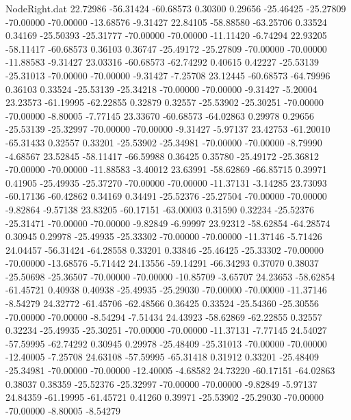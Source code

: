 \begin{filecontents}{NodeRight.dat}
  22.72986  -56.31424  -60.68573     0.30300    0.29656  -25.46425  -25.27809  -70.00000  -70.00000  -13.68576   -9.31427
  22.84105  -58.88580  -63.25706     0.33524    0.34169  -25.50393  -25.31777  -70.00000  -70.00000  -11.11420   -6.74294
  22.93205  -58.11417  -60.68573     0.36103    0.36747  -25.49172  -25.27809  -70.00000  -70.00000  -11.88583   -9.31427
  23.03316  -60.68573  -62.74292     0.40615    0.42227  -25.53139  -25.31013  -70.00000  -70.00000   -9.31427   -7.25708
  23.12445  -60.68573  -64.79996     0.36103    0.33524  -25.53139  -25.34218  -70.00000  -70.00000   -9.31427   -5.20004
  23.23573  -61.19995  -62.22855     0.32879    0.32557  -25.53902  -25.30251  -70.00000  -70.00000   -8.80005   -7.77145
  23.33670  -60.68573  -64.02863     0.29978    0.29656  -25.53139  -25.32997  -70.00000  -70.00000   -9.31427   -5.97137
  23.42753  -61.20010  -65.31433     0.32557    0.33201  -25.53902  -25.34981  -70.00000  -70.00000   -8.79990   -4.68567
  23.52845  -58.11417  -66.59988     0.36425    0.35780  -25.49172  -25.36812  -70.00000  -70.00000  -11.88583   -3.40012
  23.63991  -58.62869  -66.85715     0.39971    0.41905  -25.49935  -25.37270  -70.00000  -70.00000  -11.37131   -3.14285
  23.73093  -60.17136  -60.42862     0.34169    0.34491  -25.52376  -25.27504  -70.00000  -70.00000   -9.82864   -9.57138
  23.83205  -60.17151  -63.00003     0.31590    0.32234  -25.52376  -25.31471  -70.00000  -70.00000   -9.82849   -6.99997
  23.92312  -58.62854  -64.28574     0.30945    0.29978  -25.49935  -25.33302  -70.00000  -70.00000  -11.37146   -5.71426
  24.04457  -56.31424  -64.28558     0.33201    0.33846  -25.46425  -25.33302  -70.00000  -70.00000  -13.68576   -5.71442
  24.13556  -59.14291  -66.34293     0.37070    0.38037  -25.50698  -25.36507  -70.00000  -70.00000  -10.85709   -3.65707
  24.23653  -58.62854  -61.45721     0.40938    0.40938  -25.49935  -25.29030  -70.00000  -70.00000  -11.37146   -8.54279
  24.32772  -61.45706  -62.48566     0.36425    0.33524  -25.54360  -25.30556  -70.00000  -70.00000   -8.54294   -7.51434
  24.43923  -58.62869  -62.22855     0.32557    0.32234  -25.49935  -25.30251  -70.00000  -70.00000  -11.37131   -7.77145
  24.54027  -57.59995  -62.74292     0.30945    0.29978  -25.48409  -25.31013  -70.00000  -70.00000  -12.40005   -7.25708
  24.63108  -57.59995  -65.31418     0.31912    0.33201  -25.48409  -25.34981  -70.00000  -70.00000  -12.40005   -4.68582
  24.73220  -60.17151  -64.02863     0.38037    0.38359  -25.52376  -25.32997  -70.00000  -70.00000   -9.82849   -5.97137
  24.84359  -61.19995  -61.45721     0.41260    0.39971  -25.53902  -25.29030  -70.00000  -70.00000   -8.80005   -8.54279

\end{filecontents}
